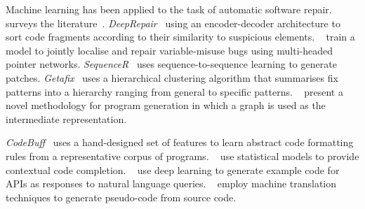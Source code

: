 Machine learning has been applied to the task of automatic software repair. \citeauthor{Monperrus2018} surveys the literature~\cite{Monperrus2018}.
\emph{DeepRepair}~\cite{White2019} using an encoder-decoder architecture to sort code fragments according to their similarity to suspicious elements.
\citeauthor{Vasic2019}~\cite{Vasic2019} train a model to jointly localise and repair variable-misuse bugs using multi-headed pointer networks.
\emph{SequenceR}~\cite{Chen2018} uses sequence-to-sequence learning to generate patches.
\emph{Getafix}~\cite{Bader2019} uses a hierarchical clustering algorithm that summarises fix patterns into a hierarchy ranging from general to specific patterns.
\citeauthor{Brockschmidt2018}~\cite{Brockschmidt2018} present a novel methodology for program generation in which a graph is used as the intermediate representation.

\emph{CodeBuff}~\cite{Terence2016} uses a hand-designed set of features to learn abstract code formatting rules from a representative corpus of programs.
\citeauthor{Raychev2014}~\cite{Raychev2014} use statistical models to provide contextual code completion.
\citeauthor{Zhang2015a}~\cite{Zhang2015a} use deep learning to generate example code for APIs as responses to natural language queries.
\citeauthor{Oda2015}~\cite{Oda2015} employ machine translation techniques to generate pseudo-code from source code.


